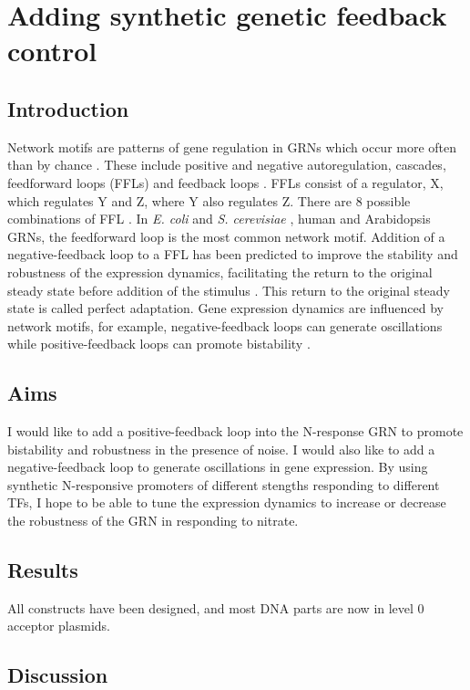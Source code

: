 \documentclass[../main.tex]{subfiles}
\begin{document}
\chapter{Adding synthetic genetic feedback control}\label{chapter6}
\section{Introduction}\label{chapter6:introduction}
Network motifs are patterns of gene regulation in GRNs which occur more often than by chance \autocite{miloNetworkMotifsSimple2002}.
These include positive and negative autoregulation, cascades, feedforward loops (FFLs) and feedback loops \autocite{shovalSnapShotNetworkMotifs2010}.
FFLs consist of a regulator, X, which regulates Y and Z, where Y also regulates Z.
There are 8 possible combinations of FFL \autocite{shovalSnapShotNetworkMotifs2010}.
In \textit{E. coli} \autocite{shen-orrNetworkMotifsTranscriptional2002} and \textit{S. cerevisiae} \autocite{leeTranscriptionalRegulatoryNetworks2002}, human \autocite{boyerCoreTranscriptionalRegulatory2005} and Arabidopsis \autocite{chenArchitectureGeneRegulatory2018} GRNs, the feedforward loop is the most common network motif.
Addition of a negative-feedback loop to a FFL has been predicted to improve the stability and robustness of the expression dynamics, facilitating the return to the original steady state before addition of the stimulus \autocite{reevesEngineeringPrinciplesCombining2019}.
This return to the original steady state is called perfect adaptation.
Gene expression dynamics are influenced by network motifs, for example, negative\hyp{}feedback loops can generate oscillations while positive\hyp{}feedback loops can promote bistability \autocite{shovalSnapShotNetworkMotifs2010}.
\section{Aims}\label{chapter6:aims}
I would like to add a positive\hyp{}feedback loop into the N-response GRN to promote bistability and robustness in the presence of noise. I would also like to add a negative\hyp{}feedback loop to generate oscillations in gene expression.
By using synthetic N-responsive promoters of different stengths responding to different TFs, I hope to be able to tune the expression dynamics to increase or decrease the robustness of the GRN in responding to nitrate.
\section{Results}\label{chapter6:results}
All constructs have been designed, and most DNA parts are now in level 0 acceptor plasmids.
\section{Discussion}\label{chapter6:discussion}
\end{document}
